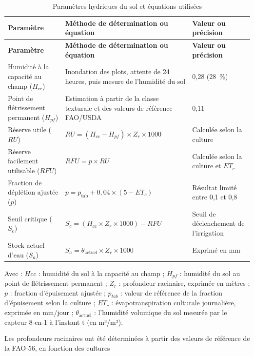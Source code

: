 {\small
\begin{longtable}{|p{3.6cm}|p{6.2cm}|p{4.2cm}|}
    \caption{Paramètres hydriques du sol et équations utilisées}
    \label{tab:parametres_hydriques} \\
    \hline
    \textbf{Paramètre} & \textbf{Méthode de détermination ou équation} & \textbf{Valeur ou précision} \\
    \hline
    \endfirsthead
    \hline
    \textbf{Paramètre} & \textbf{Méthode de détermination ou équation} & \textbf{Valeur ou précision} \\
    \hline
    \endhead
    Humidité à la capacité au champ ($H_{cc}$) & Inondation des plots, attente de 24 heures, puis mesure de l'humidité du sol & 0,28 (28~\%) \\
    \hline
    Point de flétrissement permanent ($H_{pf}$) & Estimation à partir de la classe texturale et des valeurs de référence FAO/USDA \cite[chap.~7, table~19]{allen_crop_1998-1} & 0,11 \\
    \hline
    Réserve utile ($RU$) & $RU = (H_{cc} - H_{pf}) \times Z_r \times 1000$ \cite[chap.~8]{allen_crop_1998-1} & Calculée selon la culture \\
    \hline
    Réserve facilement utilisable ($RFU$) & $RFU = p \times RU$ \cite[chap.~8]{allen_crop_1998-1} & Calculée selon la culture et $ET_c$ \\
    \hline
    Fraction de déplétion ajustée ($p$) & $p = p_{\text{tab}} + 0{,}04 \times (5 - ET_c)$ \cite[chap.~8, table~22]{allen_crop_1998-1} & Résultat limité entre 0,1 et 0,8 \\
    \hline
    Seuil critique ($S_c$) & $S_c = (H_{cc} \times Z_r \times 1000) - RFU$ & Seuil de déclenchement de l'irrigation \\
    \hline
    Stock actuel d'eau ($S_a$) & $S_a = \theta_{\text{actuel}} \times Z_r \times 1000$ & Exprimé en mm \\
    \hline
\end{longtable}
}

Avec : $Hcc$ : humidité du sol à la capacité au champ ; $H_{pf}$ : humidité du sol au point de flétrissement permanent ; $Z_r$ : profondeur racinaire, exprimée en mètres ; $p$ : fraction d’épuisement ajustée ; 
$p_{tab}$ : valeur de référence de la fraction d’épuisement selon la culture ; $ET_c$ : évapotranspiration culturale journalière, exprimée en mm/jour ; $\theta_{\text{actuel}}$ : l'humidité volumique du sol mesurée par le capteur 8-en-1 à l'instant t (en m³/m³).

Les profondeurs racinaires ont été déterminées à partir des valeurs de référence de la FAO-56, en fonction des cultures \cite[chap.~8,Table.~22]{allen_crop_1998-1}

